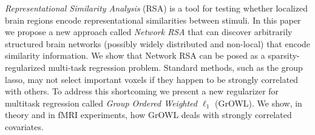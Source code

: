 \emph{Representational Similarity Analysis} (RSA) is a tool for testing whether localized brain regions encode representational similarities between stimuli.  In this paper we propose a new approach called {\em Network RSA} that can discover arbitrarily structured brain networks (possibly widely distributed and non-local) that encode similarity information.  We show that Network RSA can be posed as a sparsity-regularized multi-task regression problem. Standard methods, such as the group lasso, may not select important voxels if they happen to be strongly correlated with others. To address this shortcoming we present a new regularizer for multitask regression called \emph{Group Ordered Weighted $\ell_1$} (GrOWL). We show, in theory and in fMRI experiments, how GrOWL deals with strongly correlated covariates.  